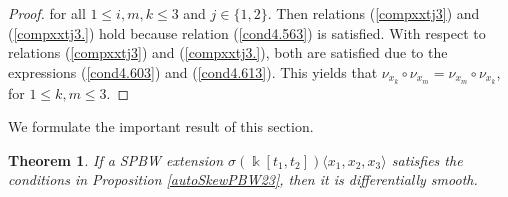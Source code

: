 \documentclass{amsart}
\newtheorem{theorem}{Theorem}[section]
\theoremstyle{definition}
\theoremstyle{remark}
\numberwithin{equation}{section}
\begin{document}
\begin{proof}
for all $1\leq i,m,k  \leq 3$ and $j \in \{1, 2\}$. Then relations {\rm (}\ref{compxxtj3}{\rm )} and {\rm (}\ref{compxxtj3.}{\rm )} hold because relation {\rm (}\ref{cond4.563}{\rm )} is satisfied. With respect to relations {\rm (}\ref{compxxtj3}{\rm )} and {\rm (}\ref{compxxtj3.}{\rm )}, both are satisfied due to the expressions {\rm (}\ref{cond4.603}{\rm )} and {\rm (}\ref{cond4.613}{\rm )}. This yields that $\nu_{x_k} \circ \nu_{x_m} = \nu_{x_m} \circ \nu_{x_k}$, for  $1\leq k, m \leq 3$.
\end{proof}

We formulate the important result of this section.

\begin{theorem}\label{smoothPBW23}
If a SPBW extension $\sigma(\Bbbk[t_1, t_2])\langle x_1, x_2, x_3\rangle$ satisfies the conditions in Proposition \ref{autoSkewPBW23}, then it is differentially smooth.
\end{theorem}
\end{document}
